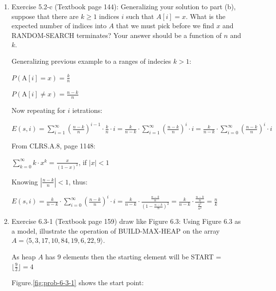 \documentclass[11pt]{article}
\begin{document}
\begin{enumerate}
	
	

\item Exercise 5.2-c (Textbook page 144): Generalizing your solution to part (b), suppose that there are $k\geq 1$ indices $i$ such that $A[i]=x$. What is the expected number of indices into $A$ that we must pick before we find $x$ and RANDOM-SEARCH terminates? Your answer should be a function of $n$ and $k$.

	Generalizing previous example to a ranges of indecies $k>1$: 

	\hspace{10mm} $P(\mathrm{A}[i]=x) = \frac{k}{n}$
	
	\hspace{10mm} $P(\mathrm{A}[i]\neq x) = \frac{n-k}{n}$
	
	Now repeating for $i$ ietrations:
	
	\hspace{10mm} $E(s,i) = \sum_{i=1}^{\infty} (\frac{n-k}{n})^{i-1}\cdot\frac{k}{n}\cdot i=
	 \frac{k}{n-k} \cdot \sum_{i=1}^{\infty} (\frac{n-k}{n})^{i}\cdot i= 
	 \frac{k}{n-k} \cdot \sum_{i=0}^{\infty} (\frac{n-k}{n})^{i}\cdot i$
	 
 	From CLRS.A.8, page 1148:
	
	\hspace{10mm} $\sum_{k=0}^{\infty} k\cdot x^{k}=\frac{x}{(1-x)^{2}}$, if $|x|<1$	
	
	Knowing $|\frac{n-k}{n}|<1$, thus:

	\hspace{10mm} $E(s,i) = \frac{k}{n-k} \cdot \sum_{i=0}^{\infty} (\frac{n-k}{n})^{i}\cdot i = 
	\frac{k}{n-k} \cdot \frac{\frac{n-k}{n}}{(1-\frac{n-k}{n})^{2}} = 
	\frac{k}{n-k} \cdot \frac{\frac{n-k}{n}}{\frac{k^{2}}{n^{2}}}=\frac{n}{k}$


\pagebreak
\item Exercise 6.3-1 (Textbook page 159) draw like Figure 6.3: Using Figure 6.3 as a model, illustrate the operation of BUILD-MAX-HEAP on the
array $A=\langle 5, 3, 17, 10, 84, 19, 6, 22, 9 \rangle	$.

	As heap $A$ has 9 elements then the starting element will be START = 
	$\lfloor	 \frac{9}{2}	\rfloor	 = 4$

	Figure.\ref{fig:prob-6-3-1} shows the start point:

	\begin{figure}[!h]


\end{figure}
\end{enumerate}
\end{document}
